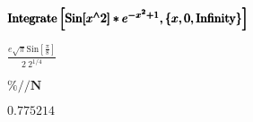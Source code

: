 \documentclass{article}
\begin{document}
\begin{doublespace}
\noindent\(\pmb{\text{}}\\
\pmb{\text{Integrate}\left[\text{Sin}[x{}^{\wedge}2]*e^{-x^2+1}, \{x, 0 , \text{Infinity}\}\right]}\)
\end{doublespace}

\begin{doublespace}
\noindent\(\frac{e \sqrt{\pi } \text{Sin}\left[\frac{\pi }{8}\right]}{2\ 2^{1/4}}\)
\end{doublespace}

\begin{doublespace}
\noindent\(\pmb{\%\text{//}N}\)
\end{doublespace}

\begin{doublespace}
\noindent\(0.775214\)
\end{doublespace}
\end{document}
